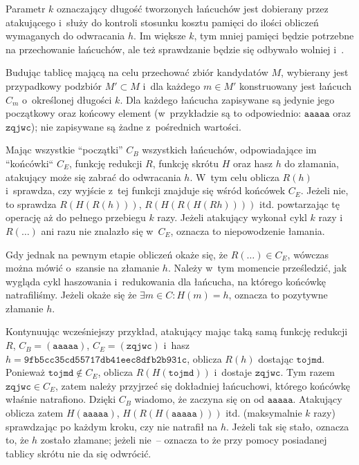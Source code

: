 Parametr $k$ oznaczający długość tworzonych łańcuchów jest dobierany przez
atakującego i~służy do kontroli stosunku kosztu pamięci do ilości obliczeń
wymaganych do odwracania $h$. Im większe $k$, tym mniej pamięci będzie
potrzebne na przechowanie łańcuchów, ale też sprawdzanie będzie się odbywało
wolniej i~.

Budując tablicę mającą na celu przechować zbiór kandydatów $M$, wybierany jest
przypadkowy podzbiór $M' \subset M$ i~dla każdego $m \in M'$ konstruowany jest
łańcuch $C_m$ o~określonej długości $k$. Dla każdego łańcucha zapisywane są
jedynie jego początkowy oraz końcowy element (w~przykładzie są to odpowiednio:
$\mathtt{aaaaa}$ oraz $\mathtt{zqjwc}$); nie zapisywane są żadne z~pośrednich
wartości.

Mając wszystkie ``początki'' $C_B$ wszystkich łańcuchów, odpowiadające im
``końcówki`` $C_E$, funkcję redukcji $R$, funkcję skrótu $H$ oraz hasz $h$ do
złamania, atakujący może się zabrać do odwracania $h$. W~tym celu oblicza
$R(h)$ i~sprawdza, czy wyjście z~tej funkcji znajduje się wśród końcówek $C_E$.
Jeżeli nie, to sprawdza $R(H(R(h)))$, $R(H(R(H(Rh))))$ itd. powtarzając tę
operację aż do pełnego przebiegu $k$ razy. Jeżeli atakujący wykonał cykl $k$
razy i~$R(\ldots)$ ani razu nie znalazło się w~$C_E$, oznacza to niepowodzenie
łamania.

Gdy jednak na pewnym etapie obliczeń okaże się, że $R(\ldots) \in C_E$, wówczas
można mówić o~szansie na złamanie $h$. Należy w~tym momencie prześledzić, jak
wygląda cykl haszowania i~redukowania dla łańcucha, na którego końcówkę
natrafiliśmy. Jeżeli okaże się że $\exists m \in C : H(m) = h$, oznacza to
pozytywne złamanie $h$.

Kontynuując wcześniejszy przykład, atakujący mając taką samą funkcję redukcji
$R$, $C_B = (\mathtt{aaaaa})$, $C_E = (\mathtt{zqjwc})$ i~hasz
$h=\mathtt{9fb5cc35cd55717db41eec8dfb2b931c}$, oblicza $R(h)$ dostając
$\mathtt{tojmd}$. Ponieważ $\mathtt{tojmd} \not\in C_E$, oblicza
$R(H(\mathtt{tojmd}))$ i~dostaje $\mathtt{zqjwc}$. Tym razem $\mathtt{zqjwc}
\in C_E$, zatem należy przyjrzeć się dokładniej łańcuchowi, którego końcówkę
właśnie natrafiono. Dzięki $C_B$ wiadomo, że zaczyna się on od
$\mathtt{aaaaa}$. Atakujący oblicza zatem $H(\mathtt{aaaaa})$,
$H(R(H(\mathtt{aaaaa})))$ itd. (maksymalnie $k$ razy) sprawdzając po każdym
kroku, czy nie natrafił na $h$. Jeżeli tak się stało, oznacza to, że $h$
zostało złamane; jeżeli nie~-- oznacza to że przy pomocy posiadanej tablicy
skrótu nie da się odwrócić.

